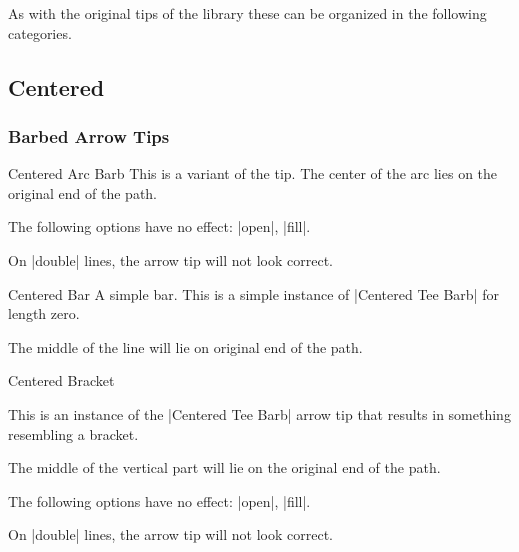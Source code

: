 \begin{multicols}{2}
As with the original tips of the  library
these can be organized in the following categories.
\subsection{Centered}
\subsubsection{Barbed Arrow Tips}
\begin{arrowtipsimple}{Centered Arc Barb}
    This is a variant of the  tip.
    The center of the arc lies on the original end of the path.

    \begin{arrowexamples}
        \arrowexample[]
        \arrowexampledup[sep]
        \arrowexampledupdot[sep]
        \arrowexample[arc=120]
        \arrowexample[arc=270]
        \arrowexample[length=2pt]
        \arrowexample[length=2pt,width=5pt]
        \arrowexample[line width=2pt]
        \arrowexample[reversed]
        \arrowexample[round]
        \arrowexample[slant=.3]
        \arrowexample[left]
        \arrowexample[right]
        \arrowexample[red]
    \end{arrowexamples}
    The following options have no effect: |open|, |fill|.

    On |double| lines, the arrow tip will not look correct.
\end{arrowtipsimple}

\begin{arrowtipsimple}{Centered Bar}
    A simple bar. This is a simple instance of |Centered Tee Barb| for length zero.
    
    The middle of the line will lie on original end of the path.
\end{arrowtipsimple}

\begin{arrowtip}{Centered Bracket}{
    This is an instance of the |Centered Tee Barb| arrow tip that results in something
    resembling a bracket.
    
    The middle of the vertical part will lie on the original end of the path.
}%
{}%
{}

    \begin{arrowexamples}
        \arrowexample[]
        \arrowexampledup[sep]
        \arrowexampledupdot[sep]
        \arrowexample[reversed]
        \arrowexample[round]
        \arrowexample[slant=.3]
        \arrowexample[left]
        \arrowexample[right]
        \arrowexample[red]
    \end{arrowexamples}
    The following options have no effect: |open|, |fill|.

    On |double| lines, the arrow tip will not look correct.
\end{arrowtip}
\end{multicols}
